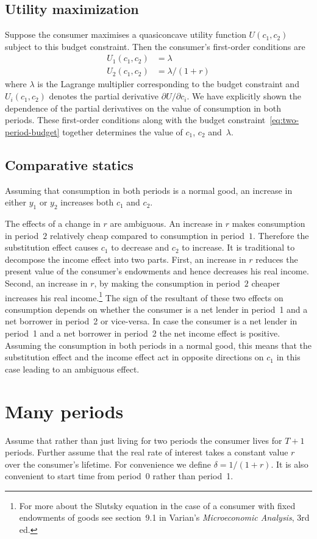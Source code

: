 \documentclass[11pt,reqno,openany]{amsbook}
\begin{document}
\subsection{Utility maximization}
Suppose the consumer maximises a quasiconcave utility
function $U(c_1,c_2)$ subject to this budget
constraint. Then the consumer's first-order conditions are
\begin{align}
U_1(c_1,c_2)&=\lambda\\
U_2(c_1,c_2)&=\lambda/(1+r)
\end{align}
where $\lambda$ is the Lagrange multiplier corresponding to
the budget constraint and $U_i(c_1,c_2)$ denotes the partial
derivative $\partial U/\partial c_i$. We have explicitly
shown the dependence of the partial derivatives on the value
of consumption in both periods. These first-order conditions
along with the budget
constraint~\eqref{eq:two-period-budget} together determines
the value of $c_1$, $c_2$ and~$\lambda$.
\subsection{Comparative statics}
Assuming that consumption in both periods is a normal good, an
increase in either $y_1$ or $y_2$ increases both $c_1$ and $c_2$.

The effects of a change in $r$ are ambiguous. An increase in $r$ makes
consumption in period~$2$ relatively cheap compared to consumption in
period~$1$. Therefore the substitution effect causes $c_1$ to decrease
and $c_2$ to increase. It is traditional to decompose the income
effect into two parts. First, an increase in $r$ reduces the present
value of the consumer's endowments and hence decreases his real
income. Second, an increase in $r$, by making the consumption in
period~$2$ cheaper increases his real income.\footnote{
For more about the Slutsky equation in the case of a consumer with
fixed endowments of goods see section~9.1 in Varian's
\emph{Microeconomic Analysis}, 3rd ed.} The sign of the
resultant of these two effects on consumption depends on whether the
consumer is a net lender in period~1 and a net borrower in period~2 or
vice-versa. In case the consumer is a net lender in period~1 and a net
borrower in period~2 the net income effect is positive. Assuming the
consumption in both periods in a normal good, this means that the
substitution effect and the income effect act in opposite directions
on $c_1$ in this case leading to an ambiguous effect.

\section{Many periods}
Assume that rather than just living for two periods the consumer lives
for $T+1$ periods. Further assume that the real rate of interest takes a
constant value $r$ over the consumer's lifetime. For convenience we
define $\delta=1/(1+r)$. It is also convenient to start time from
period~0 rather than period~1.
\end{document}
